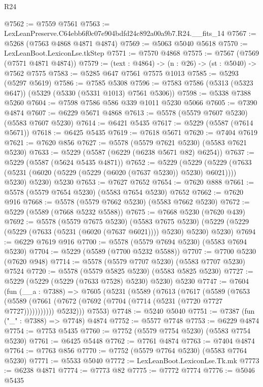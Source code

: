 \begin{lexlean}{R24}
\begin{coremodule}
@7562 := @7559 @7561
@7563 := LexLeanPreserve.C64ebb6f0c07e904bdfd24c892a00a9b7.R24.__fits_14
@7567 := @5268 (@7563 @4868 @4871 @4874)
@7569 := @5063 @5040 @5618
@7570 := LexLeanBoot.LexiconLse.tkStep
@7571 := @7570 @4868
@7575 := @7567 (@7569 (@7571 @4871 @4874))
@7579 := (text : @4864) -> (n : @26) -> (st : @5040) -> @7562 @7575
@7583 := @5285 @647 @7561 @7575 @1013
@7585 := @5293 (@5297 @5619)
@7586 := @7585 @5308
@7596 := @7583 @7586 (@5313 (@5323 @647)) (@5329 (@5330 (@5331 @1013) @7561 @5306))
@7598 := @5338 @7388 @5260
@7604 := @7598 @7586 @586 @339 @1011 @5230 @5066
@7605 := @7390 @4874
@7607 := @6229 @5671 @4868
@7613 := @5578 (@5579 @7607 @5230) (@5583 @7607 @5230)
@7614 := @6421 @5435
@7617 := @5229 (@5587 (@7614 @5671))
@7618 := @6425 @5435
@7619 := @7618 @5671
@7620 := @7404 @7619
@7621 := @7620 @856
@7627 := @5578 (@5579 @7621 @5230) (@5583 @7621 @5230)
@7633 := @5229 (@5587 (@6229 (@6238 @5671 @82) @6254))
@7637 := @5229 (@5587 (@5624 @5435 @4871))
@7652 := @5229
    (@5229
      (@5229 (@7633 (@5231 (@6020 (@5229 (@5229 (@6020 (@7637 @5230)) @5230) @6021)))) @5230)
      @5230)
    @5230
@7653 := @7627 @7652
@7654 := @7620 @888
@7661 := @5578 (@5579 @7654 @5230) (@5583 @7654 @5230) @7652
@7662 := @7620 @916
@7668 := @5578 (@5579 @7662 @5230) (@5583 @7662 @5230)
@7672 := @5229 (@5589 (@7668 @5232 @5588))
@7675 := @7668 @5230 (@7620 @439)
@7692 := @5578
    (@5579 @7675 @5230)
    (@5583 @7675 @5230)
    (@5229 (@5229 (@5229 (@7633 (@5231 (@6020 (@7637 @6021)))) @5230) @5230) @5230)
@7694 := @6229 @7619 @916
@7700 := @5578 (@5579 @7694 @5230) (@5583 @7694 @5230)
@7704 := @5229 (@5589 (@7700 @5232 @5588))
@7707 := @7700 @5230 (@7620 @948)
@7714 := @5578 (@5579 @7707 @5230) (@5583 @7707 @5230) @7524
@7720 := @5578 (@5579 @5825 @5230) (@5583 @5825 @5230)
@7727 := @5229 (@5229 (@5229 (@7633 @7528) @5230) @5230) @5230
@7747 := @7604
    (fun (__a : @7388) =>
    @7605
      (@5231
        (@5589
          (@7613
            (@7617
              (@5589
                (@7653
                  (@5589 (@7661 (@7672 (@7692 (@7704 (@7714 (@5231 (@7720 @7727 @7727)))))))))))
            @5232)))
      @7553)
@7748 := @5240 @5040
@7751 := @7387 (fun ("_" : @7388) => @7748) @4874
@7752 := @5577 @7748
@7753 := @6229 @4874
@7754 := @7753 @5435
@7760 := @7752 (@5579 @7754 @5230) (@5583 @7754 @5230)
@7761 := @6425 @5448
@7762 := @7761 @4874
@7763 := @7404 @4874
@7764 := @7763 @856
@7770 := @7752 (@5579 @7764 @5230) (@5583 @7764 @5230)
@7771 := @5533 @5040
@7772 := LexLeanBoot.LexiconLse.Tk.mk
@7773 := @6238 @4871
@7774 := @7773 @82
@7775 := @7772 @7774
@7776 := @5046 @5435

\end{coremodule}
\end{lexlean}
